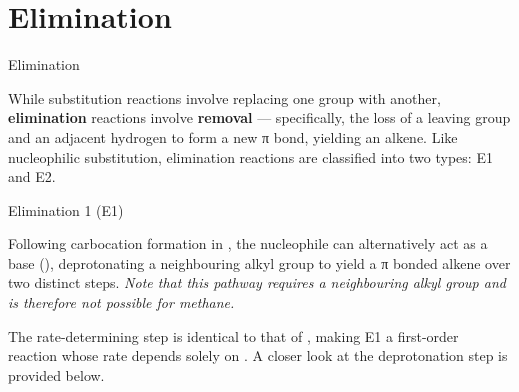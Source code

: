\documentclass[10pt]{article}
\begin{document}
\section{Elimination}
  
  \begin{core}{Elimination} 

    While substitution reactions involve replacing one group with another, \textbf{elimination} reactions involve \textbf{removal} --- specifically, the loss of a leaving group and an adjacent hydrogen to form a new π bond, yielding an alkene. Like nucleophilic substitution, elimination reactions are classified into two types: E1 and E2.

  \end{core}

  \begin{core}{Elimination 1 (E1)}

    Following carbocation formation in \sno, the nucleophile can alternatively act as a base (), deprotonating a neighbouring alkyl group to yield a π bonded alkene over two distinct steps. \textit{Note that this pathway requires a neighbouring alkyl group and is therefore not possible for methane.}

    \vspace{10pt}

    The rate-determining step is identical to that of \sno, making E1 a first-order reaction whose rate depends solely on \ce{[R-L]}. A closer look at the deprotonation step is provided below.



\end{core}
\end{document}
